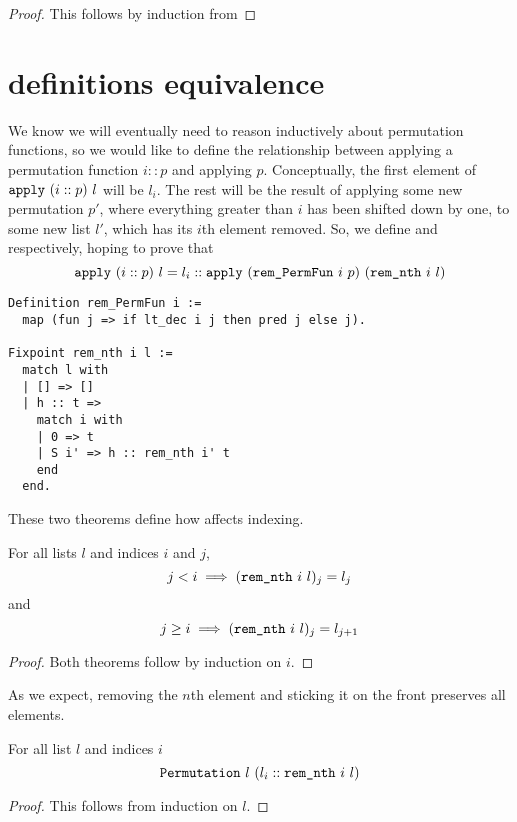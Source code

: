 \documentclass[sigplan,10pt,anonymous,review]{thesis}
\begin{document}
\hdsortsortedS
\begin{proof}
  This follows by induction from 
\end{proof}

\section{ definitions equivalence}
\label{appendix:perm_def_eq}

We know we will eventually need to reason inductively about
permutation functions, so we would like to define the relationship
between applying a permutation function $i :: p$ and applying $p$.
Conceptually, the first element of $\texttt{\textup{apply}}~(i::p)~l$ will be
$l_i$. The rest will be the result of applying some new permutation
$p'$, where everything greater than $i$ has been shifted down by one,
to some new list $l'$, which has its $i$th element removed. So, we
define  and  respectively, hoping to
prove that
\begin{equation*}
  \texttt{\textup{apply}}~(i::p)~l =
  l_i :: \texttt{\textup{apply}}~(\texttt{\textup{rem\_PermFun}}~i~p)~(\texttt{\textup{rem\_nth}}~i~l)
\end{equation*}
\begin{lstlisting}
Definition rem_PermFun i :=
  map (fun j => if lt_dec i j then pred j else j).

Fixpoint rem_nth i l :=
  match l with
  | [] => []
  | h :: t =>
    match i with
    | 0 => t
    | S i' => h :: rem_nth i' t
    end
  end.
\end{lstlisting}

These two theorems define how  affects indexing.
\begin{theorem}
  For all lists $l$ and indices $i$ and $j$,
  \begin{equation*}
    j < i \implies (\texttt{\textup{rem\_nth}}~i~l)_j = l_j
  \end{equation*}
  and
  \begin{equation*}
    j \ge i \implies (\texttt{\textup{rem\_nth}}~i~l)_j = l_{j+1}
  \end{equation*}
\end{theorem}
\begin{proof}
  Both theorems follow by induction on $i$.
\end{proof}

As we expect, removing the $n$th element and sticking it on the front
preserves all elements.
\begin{theorem}
  For all list $l$ and indices $i$
  \begin{equation*}
    \texttt{\textup{Permutation}}~l~(l_i :: \texttt{\textup{rem\_nth}}~i~l)
  \end{equation*}
\end{theorem}
\begin{proof}
  This follows from induction on $l$.
\end{proof}
\end{document}
